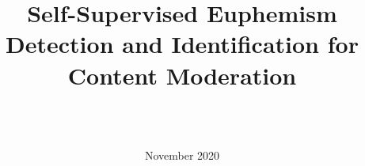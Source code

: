 \newif\ifanonymized\anonymizedtrue  %
\newif\ifroughdraft\roughdraftfalse  %
\newif\ifdraft\drafttrue  %



\graphicspath{{figures/}}

\ifdraft
\newcommand{\kibitz}[3]
{\textcolor[HTML]{#1}{[\textbf{#2}\ifx&#3&\else: \textit{#3}\fi]}}
\else
\newcommand{\kibitz}[3]{}
\fi

\newcommand{\todo}[1]{\kibitz{e7298a}{TODO}{#1}}
\newcommand{\needcite}[1]{\kibitz{e7298a}{citation needed}{#1}}
\newcommand{\needxref}[1]{\kibitz{e7298a}{xref needed}{#1}}


\newcommand{\GF}[1]{\kibitz{1b9e77}{GF}{#1}}
\newcommand{\NC}[1]{\kibitz{d95f02}{NC}{#1}}
\newcommand{\SB}[1]{\kibitz{7570b3}{SB}{#1}}
\newcommand{\WZ}[1]{\kibitz{66a61e}{WZ}{#1}}
\newcommand{\ZW}[1]{\kibitz{e6ab02}{ZW}{#1}}

\let\needref=\needxref
\let\nicolasc=\NC


\title{Self-Supervised Euphemism Detection and Identification for Content Moderation}
\author{%
	\ifanonymized
	\\ \\
	\else
	\IEEEauthorblockN{Wanzheng Zhu}
	\IEEEauthorblockA{University of Illinois at Urbana-Champaign}
	\and
	\IEEEauthorblockN{Hongyu Gong}
	\IEEEauthorblockA{Facebook}
	\and
	\IEEEauthorblockN{Rohan Bansal}
	\IEEEauthorblockA{Carnegie Mellon University}
	\and
	\IEEEauthorblockN{Zachary Weinberg}
	\IEEEauthorblockA{University of Massachusetts, Amherst}
	\and
	\IEEEauthorblockN{Suma Bhat}
	\IEEEauthorblockA{University of Illinois at Urbana-Champaign}
	\and
	\IEEEauthorblockN{Nicolas Christin}
	\IEEEauthorblockA{Carnegie Mellon University}
	\and
	\IEEEauthorblockN{Giulia Fanti}
	\IEEEauthorblockA{Carnegie Mellon University}
	\fi}
\date{November 2020}


